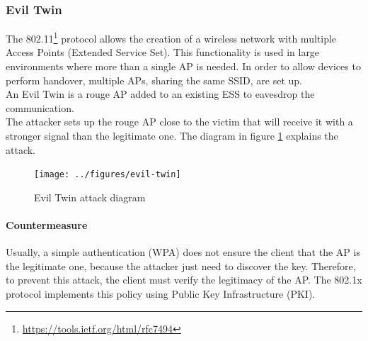 \documentclass[final]{article}
\begin{document}
\subsubsection{Evil Twin}
The 802.11\footnote{\url{https://tools.ietf.org/html/rfc7494}} protocol allows
the creation of a wireless network with multiple Access Points (Extended Service Set).
This functionality is used in large environments where more than a single AP is needed.
In order to allow devices to perform handover, multiple APs, sharing the same \ac{SSID}, are set up. \\
An Evil Twin is a rouge AP added to an existing ESS to eavesdrop the communication.\\
The attacker sets up the rouge AP close to the victim that will receive it with a stronger signal than the legitimate one.
The diagram in figure \ref{evil_twin} explains the attack.
\begin{figure}[h]
  \center
  \texttt{[image: ../figures/evil-twin]}
  \caption{Evil Twin attack diagram}
  \label{evil_twin}
\end{figure}
\paragraph{Countermeasure}
Usually, a simple authentication (WPA) does not ensure the client that the AP is the legitimate one, because the attacker just need to discover the key.
Therefore, to prevent this attack, the client must verify the legitimacy of the AP. The 802.1x protocol implements this policy using Public Key Infrastructure (PKI).
\newpage
\end{document}
